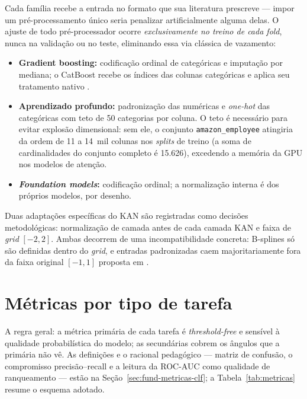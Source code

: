 Cada família recebe a entrada no formato que sua literatura prescreve ---
impor um pré-processamento único seria penalizar artificialmente alguma
delas. O ajuste de todo pré-processador ocorre \emph{exclusivamente no
treino de cada fold}, nunca na validação ou no teste, eliminando essa via
clássica de vazamento:

\begin{itemize}
  \item \textbf{Gradient boosting:} codificação ordinal de categóricas e
    imputação por mediana; o CatBoost recebe os índices das colunas
    categóricas e aplica seu tratamento nativo
    \citep{prokhorenkova2018}.
  \item \textbf{Aprendizado profundo:} padronização das numéricas e
    \emph{one-hot} das categóricas com teto de 50 categorias por coluna. O
    teto é necessário para evitar explosão dimensional: sem ele, o conjunto
    \texttt{amazon\_\allowbreak employee} atingiria da ordem de 11 a
    14~mil colunas nos \emph{splits} de treino
    (a soma de cardinalidades do conjunto completo é 15.626), excedendo a
    memória da GPU nos modelos de atenção.
  \item \textbf{\emph{Foundation models}:} codificação ordinal; a
    normalização interna é dos próprios modelos, por desenho.
\end{itemize}

Duas adaptações específicas do KAN são registradas como decisões
metodológicas: normalização de camada antes de cada camada KAN e faixa de
\emph{grid} $[-2, 2]$. Ambas decorrem de uma incompatibilidade concreta:
B-splines só são definidas dentro do \emph{grid}, e entradas padronizadas
caem majoritariamente fora da faixa original $[-1, 1]$ proposta em
\citet{kan2024}.

\section{Métricas por tipo de tarefa}
\label{sec:met-metricas}

A regra geral: a métrica primária de cada tarefa é \emph{threshold-free} e
sensível à qualidade probabilística do modelo; as secundárias cobrem os
ângulos que a primária não vê. As definições e o racional pedagógico ---
matriz de confusão, o compromisso precisão--recall e a leitura da ROC-AUC
como qualidade de ranqueamento --- estão na
Seção~\ref{sec:fund-metricas-clf}; a Tabela~\ref{tab:metricas} resume o
esquema adotado.


